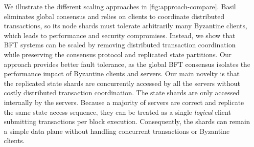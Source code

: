 We illustrate the different scaling approaches in \cref{fig:approach-compare}.
Basil eliminates global consensus and relies on clients to coordinate distributed transactions, so its node shards must tolerate arbitrarily many Byzantine clients, which leads to performance and security compromises.
Instead, we show that BFT systems can be scaled by removing distributed transaction coordination while preserving the consensus protocol and replicated state partitions.
Our approach provides better fault tolerance, as the global BFT consensus isolates the performance impact of Byzantine clients and servers.
Our main novelty is that the replicated state shards are concurrently accessed by all the servers without costly distributed transaction coordination.
The state shards are only accessed internally by the servers.
Because a majority of servers are correct and replicate the same state access sequence, they can be treated as a single \emph{logical} client submitting transactions per block execution.
Consequently, the shards can remain a simple data plane without handling concurrent transactions or Byzantine clients.


